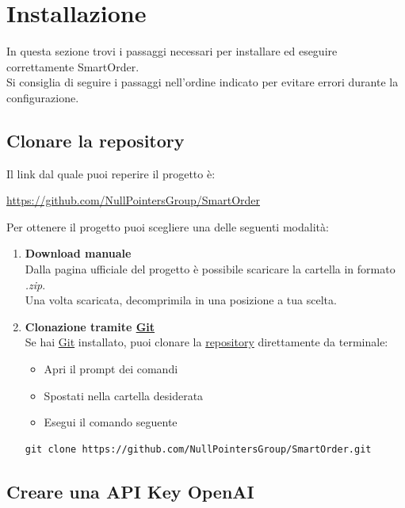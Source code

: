 \section{Installazione}

In questa sezione trovi i passaggi necessari per installare ed eseguire correttamente SmartOrder.\\
Si consiglia di seguire i passaggi nell'ordine indicato per evitare errori durante la configurazione.

\subsection{Clonare la repository}

Il link dal quale puoi reperire il progetto è:
\begin{center}
	\url{https://github.com/NullPointersGroup/SmartOrder}
\end{center}

Per ottenere il progetto puoi scegliere una delle seguenti modalità:

\begin{enumerate}
	\item \textbf{Download manuale}\\
	Dalla pagina ufficiale del progetto è possibile scaricare la cartella in formato \textit{.zip}.\\
	Una volta scaricata, decomprimila in una posizione a tua scelta.
	
	\item \textbf{Clonazione tramite \hyperlink{glossario:git}{Git}}\\
	Se hai \hyperlink{glossario:git}{Git} installato, puoi clonare la \hyperlink{glossario:repository}{repository} direttamente da terminale:
	
	\begin{itemize}[itemsep=5pt, parsep=5pt, label=$\scriptstyle\bullet$]
		\item Apri il prompt dei comandi
		\item Spostati nella cartella desiderata
		\item Esegui il comando seguente
	\end{itemize}
	
	\begin{lstlisting}[style=pseudocodice]
		git clone https://github.com/NullPointersGroup/SmartOrder.git
	\end{lstlisting}
\end{enumerate}

\subsection{Creare una API Key OpenAI}


